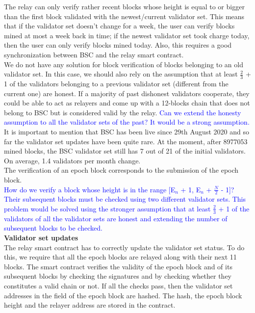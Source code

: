 The relay can only verify rather recent blocks whose height is equal to or bigger than the first block validated with the newest/current validator set. This means that if the validator set doesn't change for a week, the user can verify blocks mined at most a week back in time; if the newest validator set took charge today, then the user can only verify blocks mined today. Also, this requires a good synchronization between BSC and the relay smart contract. \\We do not have any solution for block verification of blocks belonging to an old validator set. In this case, we should also rely on the assumption that at least $\frac{2}{3}$ + 1 of the validators belonging to a previous validator set (different from the current one) are honest. If a majority of past dishonest validators cooperate, they could be able to act as relayers and come up with a 12-blocks chain that does not belong to BSC but is considered valid by the relay. \textcolor{blue}{Can we extend the honesty assumption to all the validator sets of the past? It would be a strong assumption.}\\
It is important to mention that BSC has been live since 29th August 2020 and so far the validator set updates have been quite rare. At the moment, after 8977053 mined blocks, the BSC validator set still has 7 out of 21 of the initial validators. On average, 1.4 validators per month change.\\The verification of an epoch block corresponds to the submission of the epoch block.\\ \textcolor{blue}{How do we verify a block whose height is in the range [E$_{n}$ + 1, E$_n$ + $\frac{N}{2}$ - 1]? Their subsequent blocks must be checked using two different validator sets. This problem would be solved using the stronger assumption that at least $\frac{2}{3}$ + 1 of the validators of all the validator sets are honest and extending the number of subsequent blocks to be checked.}\\

\noindent
\textbf{Validator set updates}\\
The relay smart contract has to correctly update the validator set status. To do this, we require that all the epoch blocks are relayed along with their next 11 blocks. The smart contract verifies the validity of the epoch block and of its subsequent blocks by checking the signatures and by checking whether they constitutes a valid chain or not. If all the checks pass, then the validator set addresses in the \extradata field of the epoch block are hashed. The hash, the epoch block height and the relayer address are stored in the contract.\\

